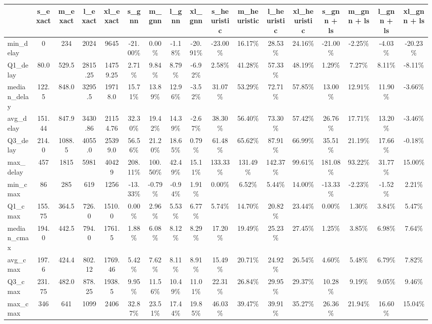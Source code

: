 \begin{tabular}{lcccccccccccccccc}
\toprule
 & s_exact & m_exact & l_exact & xl_exact & s_gnn & m_gnn & l_gnn & xl_gnn & s_heuristic & m_heuristic & l_heuristic & xl_heuristic & s_gnn + ls & m_gnn + ls & l_gnn + ls & xl_gnn + ls \\
\midrule
min_delay & 0 & 234 & 2024 & 9645 & -21.00\% & 0.00\% & -1.18\% & -20.91\% & -23.00\% & 16.17\% & 28.53\% & 24.16\% & -21.00\% & -2.25\% & -4.03\% & -20.23\% \\
Q1_delay & 80.0 & 529.5 & 2815.25 & 14759.25 & 2.71\% & 9.84\% & 8.79\% & -6.92\% & 2.58\% & 41.28\% & 57.33\% & 48.19\% & 1.29\% & 7.27\% & 8.11\% & -8.11\% \\
median_delay & 122.5 & 848.0 & 3295.5 & 19718.0 & 15.71\% & 13.89\% & 12.96\% & -3.52\% & 31.07\% & 53.29\% & 72.71\% & 57.85\% & 13.00\% & 12.91\% & 11.90\% & -3.66\% \\
avg_delay & 151.44 & 847.9 & 3430.86 & 21154.76 & 32.30\% & 19.42\% & 14.39\% & -2.67\% & 38.30\% & 56.40\% & 73.30\% & 57.42\% & 26.76\% & 17.71\% & 13.20\% & -3.46\% \\
Q3_delay & 214.0 & 1088.5 & 4055.0 & 25399.0 & 56.56\% & 21.20\% & 18.65\% & 0.79\% & 61.48\% & 65.62\% & 87.91\% & 66.99\% & 35.51\% & 21.19\% & 17.66\% & -0.18\% \\
max_delay & 457 & 1815 & 5981 & 40429 & 208.11\% & 100.50\% & 42.49\% & 15.11\% & 133.33\% & 131.49\% & 142.37\% & 99.61\% & 181.08\% & 93.22\% & 31.77\% & 15.00\% \\
min_cmax & 86 & 285 & 619 & 1256 & -13.33\% & -0.79\% & -0.94\% & 1.91\% & 0.00\% & 6.52\% & 5.44\% & 14.00\% & -13.33\% & -2.23\% & -1.52\% & 2.21\% \\
Q1_cmax & 155.75 & 364.5 & 726.0 & 1510.0 & 0.00\% & 2.96\% & 5.53\% & 6.77\% & 5.74\% & 14.70\% & 20.82\% & 23.44\% & 0.00\% & 1.30\% & 3.84\% & 5.47\% \\
median_cmax & 194.0 & 442.5 & 794.0 & 1761.5 & 1.88\% & 6.08\% & 8.12\% & 8.29\% & 17.20\% & 19.49\% & 25.23\% & 27.45\% & 1.25\% & 3.85\% & 6.98\% & 7.64\% \\
avg_cmax & 197.6 & 424.4 & 802.12 & 1769.46 & 5.42\% & 7.62\% & 8.11\% & 8.91\% & 15.49\% & 20.71\% & 24.92\% & 26.54\% & 4.60\% & 5.48\% & 6.79\% & 7.82\% \\
Q3_cmax & 231.75 & 482.0 & 878.25 & 1938.5 & 9.95\% & 11.56\% & 10.49\% & 11.01\% & 22.31\% & 26.84\% & 29.95\% & 29.37\% & 10.28\% & 9.19\% & 9.05\% & 9.46\% \\
max_cmax & 346 & 641 & 1099 & 2406 & 32.87\% & 23.51\% & 17.44\% & 19.85\% & 46.03\% & 39.47\% & 39.91\% & 35.27\% & 26.36\% & 21.94\% & 16.60\% & 15.04\% \\

\end{tabular}
